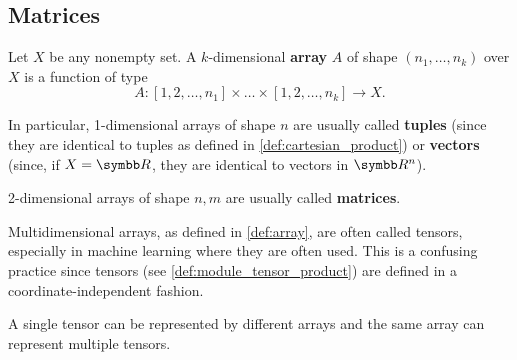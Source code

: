 \subsection{Matrices}\label{subsec:matrices}

\begin{definition}\label{def:array}
  Let \( X \) be any nonempty set. A \( k \)-dimensional \textbf{array} \( A \) of shape \( (n_1, \ldots, n_k) \) over \( X \) is a function of type
  \begin{equation*}
    A: [1, 2, \ldots, n_1] \times \ldots \times [1, 2, \ldots, n_k] \to X.
  \end{equation*}

  In particular, 1-dimensional arrays of shape \( n \) are usually called \textbf{tuples} (since they are identical to tuples as defined in \cref{def:cartesian_product}) or \textbf{vectors} (since, if \( X = \R \), they are identical to vectors in \( \R^n \)).

  2-dimensional arrays of shape \( n, m \) are usually called \textbf{matrices}.
\end{definition}

\begin{remark}\label{remark:arrays_vs_tensors}
  Multidimensional arrays, as defined in \cref{def:array}, are often called tensors, especially in machine learning where they are often used. This is a confusing practice since tensors (see \cref{def:module_tensor_product}) are defined in a coordinate-independent fashion.

  A single tensor can be represented by different arrays and the same array can represent multiple tensors.
\end{remark}
